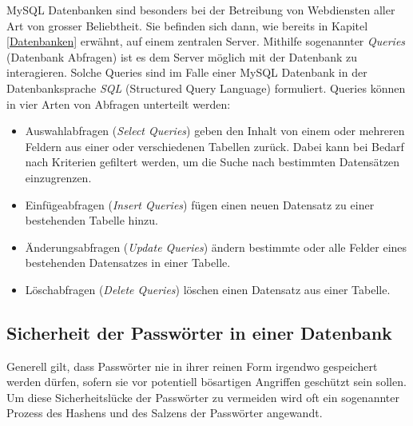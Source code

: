 \documentclass[../main.tex]{subfiles}
\begin{document}
	MySQL Datenbanken sind besonders bei der Betreibung von Webdiensten aller Art von grosser Beliebtheit. Sie befinden sich dann, wie bereits in Kapitel \ref{Datenbanken} erwähnt, auf einem zentralen Server. Mithilfe sogenannter \emph{Queries} (Datenbank Abfragen) ist es dem Server möglich mit der Datenbank zu interagieren. Solche Queries sind im Falle einer MySQL Datenbank in der Datenbanksprache \emph{SQL} (Structured Query Language) formuliert. Queries können in vier Arten von Abfragen unterteilt werden: \cite[S. 760]{IT-Handbuch}
	
	\begin{itemize}
		\item Auswahlabfragen (\emph{Select Queries}) geben den Inhalt von einem oder mehreren Feldern aus einer oder verschiedenen Tabellen zurück. Dabei kann bei Bedarf nach Kriterien gefiltert werden, um die Suche nach bestimmten Datensätzen einzugrenzen.\cite[S. 746]{IT-Handbuch}
		\item Einfügeabfragen (\emph{Insert Queries}) fügen einen neuen Datensatz zu einer bestehenden Tabelle hinzu.\cite[S. 746]{IT-Handbuch}
		\item Änderungsabfragen (\emph{Update Queries}) ändern bestimmte oder alle Felder eines bestehenden Datensatzes in einer Tabelle.\cite[S. 746]{IT-Handbuch}
		\item Löschabfragen (\emph{Delete Queries}) löschen einen Datensatz aus einer Tabelle. \cite[S. 746]{IT-Handbuch}
	\end{itemize}


	\subsection{Sicherheit der Passwörter in einer Datenbank}
	Generell gilt, dass Passwörter nie in ihrer reinen Form irgendwo gespeichert werden dürfen, sofern sie vor potentiell bösartigen Angriffen geschützt sein sollen. Um diese Sicherheitslücke der Passwörter zu vermeiden wird oft ein sogenannter Prozess des Hashens und des Salzens der Passwörter angewandt. 
	
\end{document}
